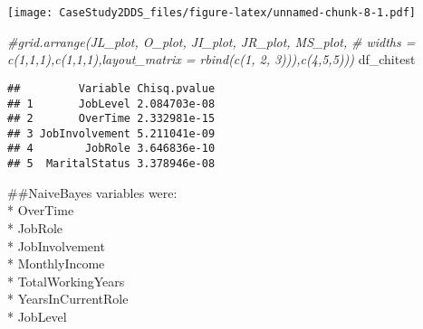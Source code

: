 \documentclass[
]{article}
\newenvironment{Shaded}{\begin{snugshade}}{\end{snugshade}}
\newcommand{\CommentTok}[1]{\textcolor[rgb]{0.56,0.35,0.01}{\textit{#1}}}
\newcommand{\NormalTok}[1]{#1}
\begin{document}
\texttt{[image: CaseStudy2DDS\_files/figure-latex/unnamed-chunk-8-1.pdf]}

\begin{Shaded}
\begin{Highlighting}[]
\CommentTok{\#grid.arrange(JL\_plot, O\_plot, JI\_plot, JR\_plot, MS\_plot,}
\CommentTok{\#  widths = c(1,1,1),c(1,1,1),layout\_matrix = rbind(c(1, 2, 3))),c(4,5,5)))}
\NormalTok{df\_chitest}
\end{Highlighting}
\end{Shaded}

\begin{verbatim}
##         Variable Chisq.pvalue
## 1       JobLevel 2.084703e-08
## 2       OverTime 2.332981e-15
## 3 JobInvolvement 5.211041e-09
## 4        JobRole 3.646836e-10
## 5  MaritalStatus 3.378946e-08
\end{verbatim}

\#\#NaiveBayes variables were:\\
* OverTime\\
* JobRole\\
* JobInvolvement\\
* MonthlyIncome\\
* TotalWorkingYears\\
* YearsInCurrentRole\\
* JobLevel
\end{document}
